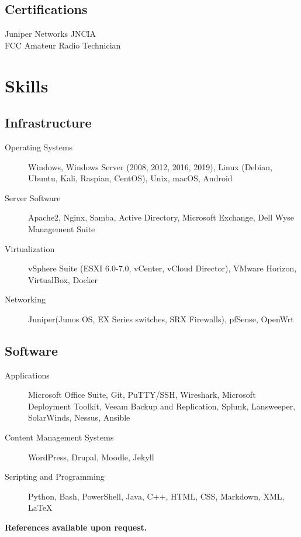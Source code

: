 \documentclass{article}
\begin{document}
\begin{samepage}
\begin{minipage}[t]{.35\textwidth}
	\subsection*{Certifications}
	Juniper Networks JNCIA \\
	FCC Amateur Radio Technician
\end{minipage}%

\section{Skills}

\subsection{Infrastructure}
\begin{description}
\item[Operating Systems] Windows, Windows Server (2008, 2012, 2016, 2019), Linux (Debian, Ubuntu, Kali, Raspian, CentOS), Unix,  macOS, Android
\item[Server Software] Apache2, Nginx, Samba, Active Directory, Microsoft Exchange, Dell Wyse Management Suite
\item[Virtualization] vSphere Suite (ESXI 6.0-7.0, vCenter, vCloud Director), VMware Horizon, VirtualBox, Docker
\item[Networking] Juniper(Junos OS, EX Series switches, SRX Firewalls), pfSense, OpenWrt
\end{description}

\subsection{Software}

\begin{description}
\item[Applications] Microsoft Office Suite, Git, PuTTY/SSH, Wireshark, Microsoft Deployment Toolkit, Veeam Backup and Replication, Splunk, Lansweeper, SolarWinds, Nessus, Ansible
\item[Content Management Systems] WordPress, Drupal, Moodle, Jekyll
\item[Scripting and Programming] Python, Bash, PowerShell, Java, C++, HTML, CSS, Markdown, XML, {\LaTeX}
\end{description}


\begin{center}
\textbf{References available upon request.}
\end{center}

\thispagestyle{empty}
\end{samepage}
\end{document}
